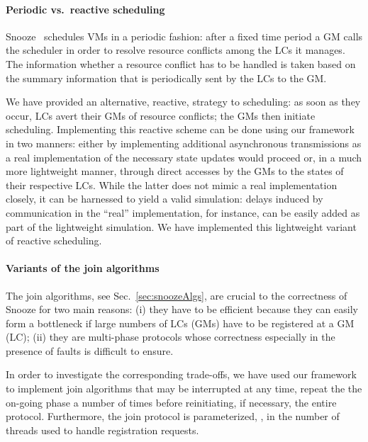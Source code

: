 \paragraph{Periodic vs.\ reactive scheduling}

Snooze~\cite{feller:ccgrid12} schedules VMs in a periodic fashion:
after a fixed time period a GM calls the scheduler in order to resolve
resource conflicts among the LCs it manages. The information whether a
resource conflict has to be handled is taken based on the summary
information that is periodically sent by the LCs to the GM.

We have provided an alternative, reactive, strategy to scheduling: as
soon as they occur, LCs avert their GMs of resource conflicts; the GMs
then initiate scheduling. Implementing this reactive scheme can be
done using our framework in two manners: either by implementing
additional asynchronous transmissions as a real implementation of the
necessary state updates would proceed or, in a much more lightweight
manner, through direct accesses by the GMs to the states of their
respective LCs. While the latter does not mimic a real implementation
closely, it can be harnessed to yield a valid simulation: delays
induced by communication in the ``real'' implementation, for instance,
can be easily added as part of the lightweight simulation. We have
implemented this lightweight variant of reactive scheduling.


\paragraph{Variants of the join algorithms}

The join algorithms, see Sec.~\ref{sec:snoozeAlgs}, are crucial to the
correctness of Snooze for two main reasons: (i) they have to be
efficient because they can easily form a bottleneck if large numbers
of LCs (GMs) have to be registered at a GM (LC); (ii) they are
multi-phase protocols whose correctness especially in the presence of
faults is difficult to ensure.

In order to investigate the corresponding trade-offs, we have used our
framework to implement join algorithms that may be interrupted at any
time, repeat the the on-going phase a number of times before
reinitiating, if necessary, the entire protocol. Furthermore, the join
protocol is parameterized, \eg, in the number of threads used to
handle registration requests.

